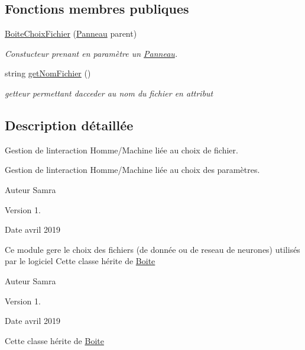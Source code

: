 \subsection*{Fonctions membres publiques}
\begin{DoxyCompactItemize}
\item 
\hyperlink{class_boite_choix_fichier_a083c181fc64db190094be5bc3803e52b}{Boite\+Choix\+Fichier} (\hyperlink{class_panneau}{Panneau} parent)
\begin{DoxyCompactList}\small\item\em Constucteur prenant en paramètre un \hyperlink{class_panneau}{Panneau}. \end{DoxyCompactList}\item 
string \hyperlink{class_boite_choix_fichier_a0e051fe462c74d12ecea8a1c3bd7fad5}{get\+Nom\+Fichier} ()
\begin{DoxyCompactList}\small\item\em getteur permettant d\textquotesingle{}acceder au nom du fichier en attribut \end{DoxyCompactList}\end{DoxyCompactItemize}


\subsection{Description détaillée}
Gestion de l\textquotesingle{}interaction Homme/\+Machine liée au choix de fichier. 

Gestion de l\textquotesingle{}interaction Homme/\+Machine liée au choix des paramètres.

\begin{DoxyAuthor}{Auteur}
Samra 
\end{DoxyAuthor}
\begin{DoxyVersion}{Version}
1. 
\end{DoxyVersion}
\begin{DoxyDate}{Date}
avril 2019
\end{DoxyDate}
Ce module gere le choix des fichiers (de donnée ou de reseau de neurones) utilisés par le logiciel Cette classe hérite de \hyperlink{class_boite}{Boite}

\begin{DoxyAuthor}{Auteur}
Samra 
\end{DoxyAuthor}
\begin{DoxyVersion}{Version}
1. 
\end{DoxyVersion}
\begin{DoxyDate}{Date}
avril 2019
\end{DoxyDate}
Cette classe hérite de \hyperlink{class_boite}{Boite} 

